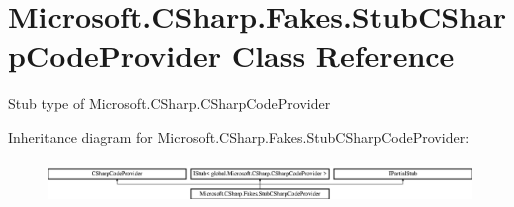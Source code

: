 \hypertarget{class_microsoft_1_1_c_sharp_1_1_fakes_1_1_stub_c_sharp_code_provider}{\section{Microsoft.\-C\-Sharp.\-Fakes.\-Stub\-C\-Sharp\-Code\-Provider Class Reference}
\label{class_microsoft_1_1_c_sharp_1_1_fakes_1_1_stub_c_sharp_code_provider}
}


Stub type of Microsoft.\-C\-Sharp.\-C\-Sharp\-Code\-Provider 


Inheritance diagram for Microsoft.\-C\-Sharp.\-Fakes.\-Stub\-C\-Sharp\-Code\-Provider\-:\begin{figure}[H]
\begin{center}
\leavevmode
\includegraphics[height=1.111111cm]{class_microsoft_1_1_c_sharp_1_1_fakes_1_1_stub_c_sharp_code_provider}
\end{center}
\end{figure}
